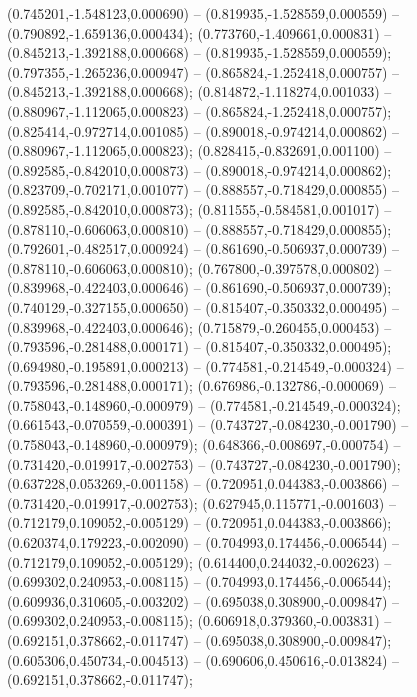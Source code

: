  (0.745201,-1.548123,0.000690) -- (0.819935,-1.528559,0.000559) -- (0.790892,-1.659136,0.000434);
 (0.773760,-1.409661,0.000831) -- (0.845213,-1.392188,0.000668) -- (0.819935,-1.528559,0.000559);
 (0.797355,-1.265236,0.000947) -- (0.865824,-1.252418,0.000757) -- (0.845213,-1.392188,0.000668);
 (0.814872,-1.118274,0.001033) -- (0.880967,-1.112065,0.000823) -- (0.865824,-1.252418,0.000757);
 (0.825414,-0.972714,0.001085) -- (0.890018,-0.974214,0.000862) -- (0.880967,-1.112065,0.000823);
 (0.828415,-0.832691,0.001100) -- (0.892585,-0.842010,0.000873) -- (0.890018,-0.974214,0.000862);
 (0.823709,-0.702171,0.001077) -- (0.888557,-0.718429,0.000855) -- (0.892585,-0.842010,0.000873);
 (0.811555,-0.584581,0.001017) -- (0.878110,-0.606063,0.000810) -- (0.888557,-0.718429,0.000855);
 (0.792601,-0.482517,0.000924) -- (0.861690,-0.506937,0.000739) -- (0.878110,-0.606063,0.000810);
 (0.767800,-0.397578,0.000802) -- (0.839968,-0.422403,0.000646) -- (0.861690,-0.506937,0.000739);
 (0.740129,-0.327155,0.000650) -- (0.815407,-0.350332,0.000495) -- (0.839968,-0.422403,0.000646);
 (0.715879,-0.260455,0.000453) -- (0.793596,-0.281488,0.000171) -- (0.815407,-0.350332,0.000495);
 (0.694980,-0.195891,0.000213) -- (0.774581,-0.214549,-0.000324) -- (0.793596,-0.281488,0.000171);
 (0.676986,-0.132786,-0.000069) -- (0.758043,-0.148960,-0.000979) -- (0.774581,-0.214549,-0.000324);
 (0.661543,-0.070559,-0.000391) -- (0.743727,-0.084230,-0.001790) -- (0.758043,-0.148960,-0.000979);
 (0.648366,-0.008697,-0.000754) -- (0.731420,-0.019917,-0.002753) -- (0.743727,-0.084230,-0.001790);
 (0.637228,0.053269,-0.001158) -- (0.720951,0.044383,-0.003866) -- (0.731420,-0.019917,-0.002753);
 (0.627945,0.115771,-0.001603) -- (0.712179,0.109052,-0.005129) -- (0.720951,0.044383,-0.003866);
 (0.620374,0.179223,-0.002090) -- (0.704993,0.174456,-0.006544) -- (0.712179,0.109052,-0.005129);
 (0.614400,0.244032,-0.002623) -- (0.699302,0.240953,-0.008115) -- (0.704993,0.174456,-0.006544);
 (0.609936,0.310605,-0.003202) -- (0.695038,0.308900,-0.009847) -- (0.699302,0.240953,-0.008115);
 (0.606918,0.379360,-0.003831) -- (0.692151,0.378662,-0.011747) -- (0.695038,0.308900,-0.009847);
 (0.605306,0.450734,-0.004513) -- (0.690606,0.450616,-0.013824) -- (0.692151,0.378662,-0.011747);
